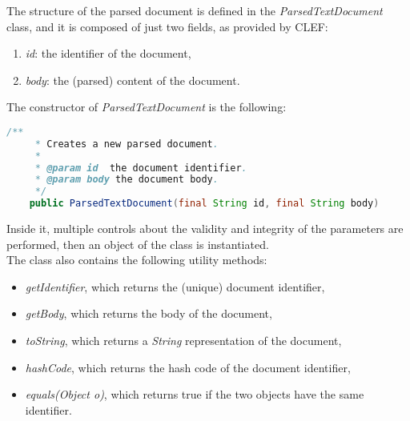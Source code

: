\begin{itemize}
The structure of the parsed document is defined in the \textit{ParsedTextDocument} class, and it is composed of just two fields, as provided by \ac{CLEF}:
\begin{enumerate}
\item \textit{id}: the identifier of the document,
\item \textit{body}: the (parsed) content of the document.
\end{enumerate}
The constructor of \textit{ParsedTextDocument} is the following:
\begin{lstlisting}[language=Java]
    /**
     * Creates a new parsed document.
     *
     * @param id  the document identifier.
     * @param body the document body.
     */
    public ParsedTextDocument(final String id, final String body) 
\end{lstlisting}
Inside it, multiple controls about the validity and integrity of the parameters are performed, then an object of the class is instantiated. \\
The class also contains the following utility methods:
\begin{itemize}
\item \textit{getIdentifier}, which returns the (unique) document identifier,
\item \textit{getBody}, which returns the body of the document,
\item \textit{toString}, which returns a \textit{String} representation of the document,
\item \textit{hashCode}, which returns the hash code of the document identifier,
\item \textit{equals(Object o)}, which returns true if the two objects have the same identifier.
\end{itemize}



\end{itemize}
